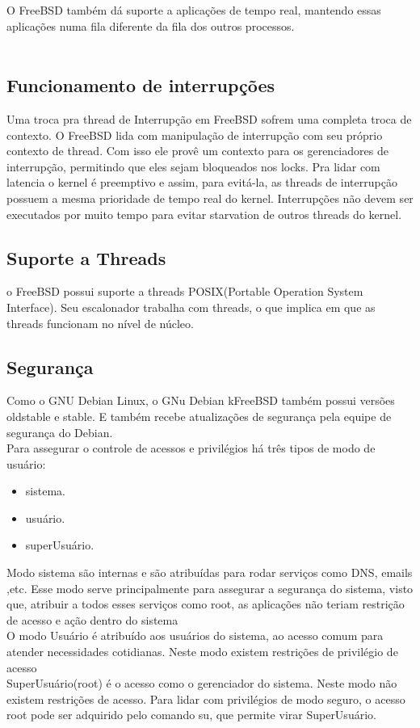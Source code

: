 \documentclass[conference]{IEEEtran}
\begin{document}
O FreeBSD também dá suporte a aplicações de tempo real, mantendo essas aplicações numa fila diferente da fila dos outros processos.\cite{DesignImplementationFreeBSD}\\ \\
\subsection{Funcionamento de interrupções}\label{sec:BSDInt}
Uma troca pra thread de Interrupção em FreeBSD sofrem uma completa troca de contexto. O FreeBSD lida com manipulação de interrupção com seu próprio contexto de thread. Com isso ele provê um contexto para os gerenciadores de interrupção, permitindo que eles sejam bloqueados nos locks. Pra lidar com latencia o kernel é preemptivo e assim, para evitá-la, as threads de interrupção possuem a mesma prioridade de tempo real do kernel. Interrupções não devem ser executados por muito tempo para evitar starvation de outros threads do kernel. \\
\subsection{Suporte a Threads}\label{sec:BSDThreads}
o FreeBSD possui suporte a threads POSIX(Portable Operation System Interface). Seu escalonador trabalha com threads, o que implica em que as threads funcionam no nível de núcleo.\cite{DesignImplementationFreeBSD}
\subsection{Segurança}\label{sec:BSDSec}
Como o GNU Debian Linux, o GNu Debian kFreeBSD também possui versões oldstable e stable. E também recebe atualizações de segurança pela equipe de segurança do Debian.\cite{DebiankFreeBSDVersions}\\
Para assegurar o controle de acessos e privilégios há três tipos de modo de usuário:
\begin{itemize}
	\item sistema.
	\item usuário.
	\item superUsuário.
\end{itemize}

Modo sistema são internas e são atribuídas para rodar serviços como DNS, emails ,etc. Esse modo serve principalmente para assegurar a segurança do sistema, visto que, atribuir a todos esses serviços como root, as aplicações não teriam restrição de acesso e ação dentro do sistema \\
O modo Usuário é atribuído aos usuários do sistema, ao acesso comum para atender necessidades cotidianas. Neste modo existem restrições de privilégio de acesso \\
SuperUsuário(root) é o acesso como o gerenciador do sistema. Neste modo não existem restrições de acesso. Para lidar com privilégios de modo seguro, o acesso root pode ser adquirido pelo comando su, que permite virar SuperUsuário. \\
\end{document}
